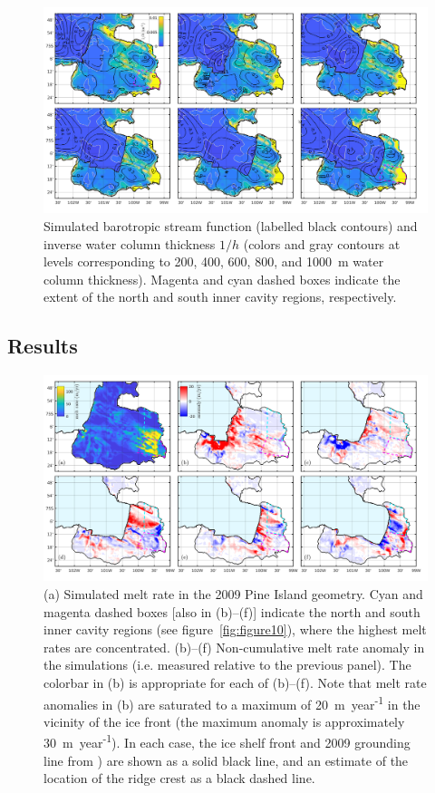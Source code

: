 \documentclass[draft]{agujournal2019}
\begin{document}
\begin{figure}
    \centering
    \includegraphics[width = \textwidth]{../make_figures/plots/figure11.png}
    \caption{Simulated barotropic stream function (labelled black contours) and inverse water column thickness $1/h$ (colors and gray contours at levels corresponding to 200, 400, 600, 800, and 1000~m water column thickness). Magenta and cyan dashed boxes indicate the extent of the north and south inner cavity regions, respectively.}
    \label{fig:figure11}
\end{figure}


\subsection{Results}

\begin{figure}
    \centering
    \includegraphics[width = \textwidth]{../make_figures/plots/figure12.png}
    \caption{(a) Simulated melt rate in the 2009 Pine Island geometry. Cyan and magenta dashed boxes [also in (b)--(f)] indicate the north and south inner cavity regions (see figure~\ref{fig:figure10}), where the highest melt rates are concentrated. (b)--(f) Non-cumulative melt rate anomaly in the simulations (i.e. measured relative to the previous panel). The colorbar in (b) is appropriate for each of (b)--(f). Note that melt rate anomalies in (b) are saturated to a maximum of 20~m~year\textsuperscript{-1} in the vicinity of the ice front (the maximum anomaly is approximately 30~m~year\textsuperscript{-1}). In each case, the ice shelf front and 2009 grounding line from ) are shown as a solid black line, and an estimate of the location of the ridge crest as a black dashed line.}
    \label{fig:figure12}
\end{figure}
\end{document}
